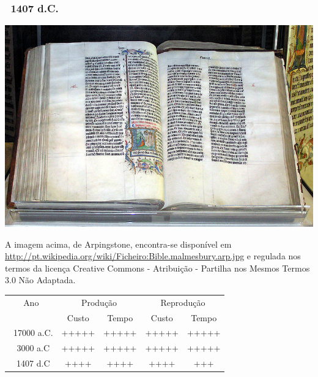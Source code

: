 \documentclass[]{beamer}
\begin{document}
\begin{frame}
    \frametitle{~1407 d.C.}
    \begin{center}
        \includegraphics[height=0.6\textheight]{pictures/bible_malmesbury_arp.jpg}
    \end{center}

    \begin{tiny}
        A imagem acima, de Arpingstone, encontra-se dispon\'{i}vel em \url{http://pt.wikipedia.org/wiki/Ficheiro:Bible.malmesbury.arp.jpg} e regulada nos termos da licen\c{c}a Creative Commons - Atribui\c{c}\~{a}o - Partilha nos Mesmos Termos 3.0 N\~{a}o Adaptada.
    \end{tiny}
\end{frame}

\begin{frame}[t]
    \begin{center}
        \begin{tabular}{|c|c|c|c|c|}
            \hline
            Ano & \multicolumn{2}{|c|}{Produ\c{c}\~{a}o} & \multicolumn{2}{|c|}{Reprodu\c{c}\~{a}o} \\ \cline{2-5}
            & Custo & Tempo & Custo & Tempo \\ \hline
            ~17000 a.C. & +++++ & +++++ & +++++ & +++++  \\ \hline
            ~3000 a.C & +++++ & +++++ & +++++ & +++++ \\ \hline
            ~1407 d.C & ++++ & ++++ & ++++ & +++ \\ \hline
        \end{tabular}
    \end{center}
\end{frame}
\end{document}
